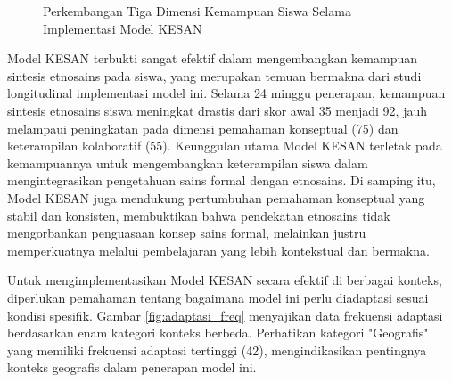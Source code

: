 \documentclass[12pt,a4paper,oneside]{book}
\begin{document}
\begin{figure}[H]
  \centering
  \caption{Perkembangan Tiga Dimensi Kemampuan Siswa Selama Implementasi Model KESAN}
  \label{fig:perkembangan_kemampuan}
\end{figure}

Model KESAN terbukti sangat efektif dalam mengembangkan kemampuan sintesis etnosains pada siswa, yang merupakan temuan bermakna dari studi longitudinal implementasi model ini. Selama 24 minggu penerapan, kemampuan sintesis etnosains siswa meningkat drastis dari skor awal 35 menjadi 92, jauh melampaui peningkatan pada dimensi pemahaman konseptual (75) dan keterampilan kolaboratif (55). Keunggulan utama Model KESAN terletak pada kemampuannya untuk mengembangkan keterampilan siswa dalam mengintegrasikan pengetahuan sains formal dengan etnosains. Di samping itu, Model KESAN juga mendukung pertumbuhan pemahaman konseptual yang stabil dan konsisten, membuktikan bahwa pendekatan etnosains tidak mengorbankan penguasaan konsep sains formal, melainkan justru memperkuatnya melalui pembelajaran yang lebih kontekstual dan bermakna.

Untuk mengimplementasikan Model KESAN secara efektif di berbagai konteks, diperlukan pemahaman tentang bagaimana model ini perlu diadaptasi sesuai kondisi spesifik. Gambar \ref{fig:adaptasi_freq} menyajikan data frekuensi adaptasi berdasarkan enam kategori konteks berbeda. Perhatikan kategori "Geografis" yang memiliki frekuensi adaptasi tertinggi (42), mengindikasikan pentingnya konteks geografis dalam penerapan model ini.
\end{document}
